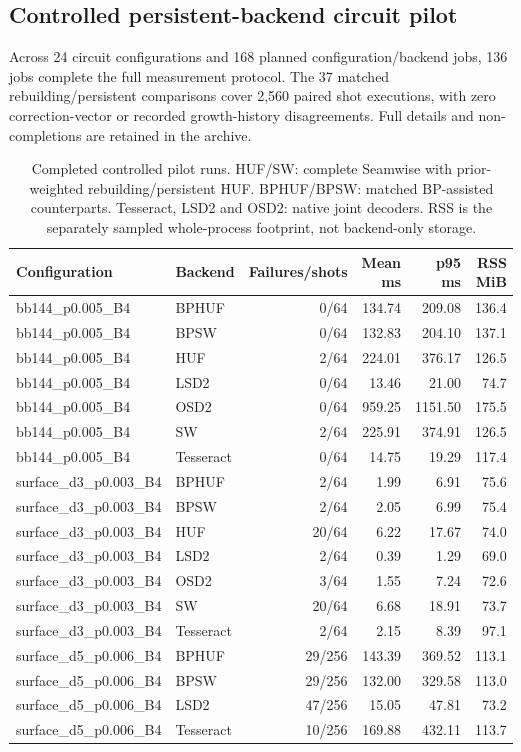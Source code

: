 \subsection{Controlled persistent-backend circuit pilot}\label{sec:newpilot}
Across 24 circuit configurations and 168 planned configuration/backend jobs, 136 jobs complete the full measurement protocol. The 37 matched rebuilding/persistent comparisons cover 2,560 paired shot executions, with zero correction-vector or recorded growth-history disagreements. Full details and non-completions are retained in the archive.
\begin{table}[t]\centering\scriptsize
\caption{Completed controlled pilot runs. HUF/SW: complete Seamwise with prior-weighted rebuilding/persistent HUF. BPHUF/BPSW: matched BP-assisted counterparts. Tesseract, LSD2 and OSD2: native joint decoders. RSS is the separately sampled whole-process footprint, not backend-only storage.}\label{tab:newpilot}
\begin{tabular}{llrrrr}\toprule Configuration&Backend&Failures/shots&Mean ms&p95 ms&RSS MiB\\\midrule
bb144\_p0.005\_B4&BPHUF&0/64&134.74&209.08&136.4\\
bb144\_p0.005\_B4&BPSW&0/64&132.83&204.10&137.1\\
bb144\_p0.005\_B4&HUF&2/64&224.01&376.17&126.5\\
bb144\_p0.005\_B4&LSD2&0/64&13.46&21.00&74.7\\
bb144\_p0.005\_B4&OSD2&0/64&959.25&1151.50&175.5\\
bb144\_p0.005\_B4&SW&2/64&225.91&374.91&126.5\\
bb144\_p0.005\_B4&Tesseract&0/64&14.75&19.29&117.4\\
surface\_d3\_p0.003\_B4&BPHUF&2/64&1.99&6.91&75.6\\
surface\_d3\_p0.003\_B4&BPSW&2/64&2.05&6.99&75.4\\
surface\_d3\_p0.003\_B4&HUF&20/64&6.22&17.67&74.0\\
surface\_d3\_p0.003\_B4&LSD2&2/64&0.39&1.29&69.0\\
surface\_d3\_p0.003\_B4&OSD2&3/64&1.55&7.24&72.6\\
surface\_d3\_p0.003\_B4&SW&20/64&6.68&18.91&73.7\\
surface\_d3\_p0.003\_B4&Tesseract&2/64&2.15&8.39&97.1\\
surface\_d5\_p0.006\_B4&BPHUF&29/256&143.39&369.52&113.1\\
surface\_d5\_p0.006\_B4&BPSW&29/256&132.00&329.58&113.0\\
surface\_d5\_p0.006\_B4&LSD2&47/256&15.05&47.81&73.2\\
surface\_d5\_p0.006\_B4&Tesseract&10/256&169.88&432.11&113.7\\
\bottomrule\end{tabular}\end{table}
